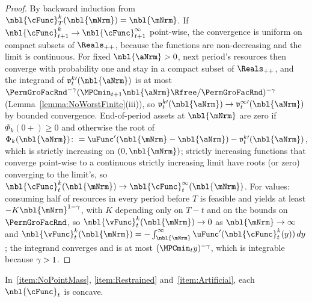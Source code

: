 \documentclass[\econtexRoot/BufferStockTheory]{subfiles}
\begin{document}
\begin{proof}
By backward induction from $\nbl{\cFunc}_{T}^{k}(\nbl{\mNrm})=\nbl{\mNrm}$.
If $\nbl{\cFunc}_{t+1}^{k}\rightarrow\nbl{\cFunc}_{t+1}^{\infty}$ point-wise, the convergence is uniform on compact subsets of $\Reals_{++}$, because the functions are non-decreasing and the limit is continuous.
For fixed $\nbl{\aNrm}>0$, next period's resources then converge with probability one and stay in a compact subset of $\Reals_{++}$, and the integrand of $\mathfrak{v}_{t}^{k\prime}(\nbl{\aNrm})$ is at most $\PermGroFacRnd^{-\CRRA}(\MPCmin_{t+1}\nbl{\aNrm}\Rfree/\PermGroFacRnd)^{-\CRRA}$ (Lemma~\ref{lemma:NoWorstFinite}(iii)), so $\mathfrak{v}_{t}^{k\prime}(\nbl{\aNrm})\rightarrow\mathfrak{v}_{t}^{\infty\prime}(\nbl{\aNrm})$ by bounded convergence.
End-of-period assets at $\nbl{\mNrm}$ are zero if $\Phi_{k}(0+)\geq 0$ and otherwise the root of $\Phi_{k}(\nbl{\aNrm})\colon=\uFunc^{\prime}(\nbl{\mNrm}-\nbl{\aNrm})-\mathfrak{v}_{t}^{k\prime}(\nbl{\aNrm})$, which is strictly increasing on $(0,\nbl{\mNrm})$; strictly increasing functions that converge point-wise to a continuous strictly increasing limit have roots (or zero) converging to the limit's, so $\nbl{\cFunc}_{t}^{k}(\nbl{\mNrm})\rightarrow\nbl{\cFunc}_{t}^{\infty}(\nbl{\mNrm})$.
For values: consuming half of resources in every period before $T$ is feasible and yields at least $-K\nbl{\mNrm}^{1-\CRRA}$, with $K$ depending only on $T-t$ and on the bounds on $\PermGroFacRnd$, so $\nbl{\vFunc}_{t}^{k}(\nbl{\mNrm})\rightarrow 0$ as $\nbl{\mNrm}\rightarrow\infty$ and $\nbl{\vFunc}_{t}^{k}(\nbl{\mNrm})=-\int_{\nbl{\mNrm}}^{\infty}\uFunc^{\prime}(\nbl{\cFunc}_{t}^{k}(y))\,dy$; the integrand converges and is at most $(\MPCmin_{t}y)^{-\CRRA}$, which is integrable because $\gamma>1$.
\end{proof}

\begin{corollary}\label{coro:ConcaveNoWorst}
In~\ref{item:NoPointMass}, \ref{item:Restrained} and~\ref{item:Artificial}, each $\nbl{\cFunc}_{t}$ is concave.
\end{corollary}
\end{document}
